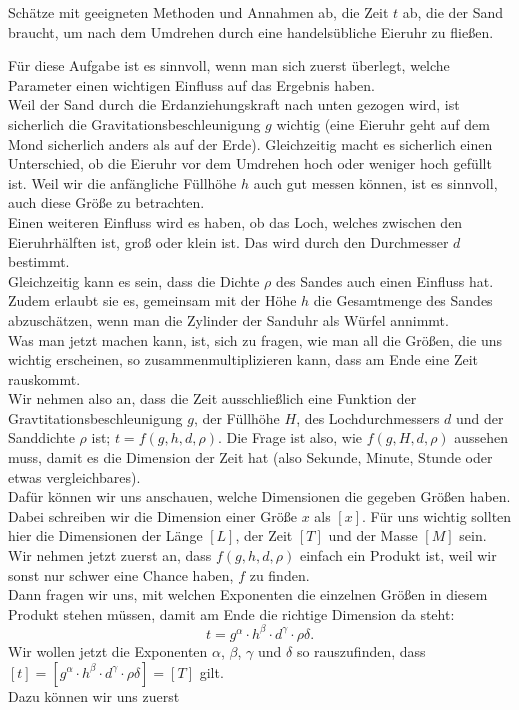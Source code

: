 \begin{Exercise}[label = sandh, origin = Aaron Wild, difficulty = 3, title = Sanduhr]
	Schätze mit geeigneten Methoden und Annahmen ab, die Zeit $t$ ab, die der Sand braucht, um nach dem Umdrehen durch eine handelsübliche Eieruhr zu fließen.
\end{Exercise}
\begin{Answer}
	Für diese Aufgabe ist es sinnvoll, wenn man sich zuerst überlegt, welche Parameter einen wichtigen Einfluss auf das Ergebnis haben.\\
	Weil der Sand durch die Erdanziehungskraft nach unten gezogen wird, ist sicherlich die Gravitationsbeschleunigung $g$ wichtig (eine Eieruhr geht auf dem Mond sicherlich anders als auf der Erde). Gleichzeitig macht es sicherlich einen Unterschied, ob die Eieruhr vor dem Umdrehen hoch oder weniger hoch gefüllt ist. Weil wir die anfängliche Füllhöhe $h$ auch gut messen können, ist es sinnvoll, auch diese Größe zu betrachten.\\
	Einen weiteren Einfluss wird es haben, ob das Loch, welches zwischen den Eieruhrhälften ist, groß oder klein ist. Das wird durch den Durchmesser $d$ bestimmt.\\
	Gleichzeitig kann es sein, dass die Dichte $\rho$ des Sandes auch einen Einfluss hat. Zudem erlaubt sie es, gemeinsam mit der Höhe $h$ die Gesamtmenge des Sandes abzuschätzen, wenn man die Zylinder der Sanduhr als Würfel annimmt.\\
	Was man jetzt machen kann, ist, sich zu fragen, wie man all die Größen, die uns wichtig erscheinen, so zusammenmultiplizieren kann, dass am Ende eine Zeit rauskommt.\\
	Wir nehmen also an, dass die Zeit ausschließlich eine Funktion der Gravtitationsbeschleunigung $g$, der Füllhöhe $H$, des Lochdurchmessers $d$ und der Sanddichte $\rho$ ist; $t = f\left(g,h,d,\rho\right)$. Die Frage ist also, wie $f\left(g,H,d,\rho\right)$ aussehen muss, damit es die Dimension der Zeit hat (also Sekunde, Minute, Stunde oder etwas vergleichbares).\\
	Dafür können wir uns anschauen, welche Dimensionen die gegeben Größen haben. Dabei schreiben wir die Dimension einer Größe $x$ als $[x]$. Für uns wichtig sollten hier die Dimensionen der Länge $[L]$, der Zeit $[T]$ und der Masse $[M]$ sein.\\
	Wir nehmen jetzt zuerst an, dass $f\left(g,h,d,\rho\right)$  einfach ein Produkt ist, weil wir sonst nur schwer eine Chance haben, $f$ zu finden.\\
	Dann fragen wir uns, mit welchen Exponenten die einzelnen Größen in diesem Produkt stehen müssen, damit am Ende die richtige Dimension da steht:
	\begin{equation}\label{sandh:dima}
			 t = g^\alpha\cdot h^\beta \cdot d^\gamma \cdot \rho\delta.
	\end{equation}
	Wir wollen jetzt die Exponenten $\alpha$, $\beta$, $\gamma$ und $\delta$ so rauszufinden, dass $[t] = [g^\alpha\cdot h^\beta \cdot d^\gamma \cdot \rho\delta] = [T]$ gilt. \\
	Dazu können wir uns zuerst 
\end{Answer}
